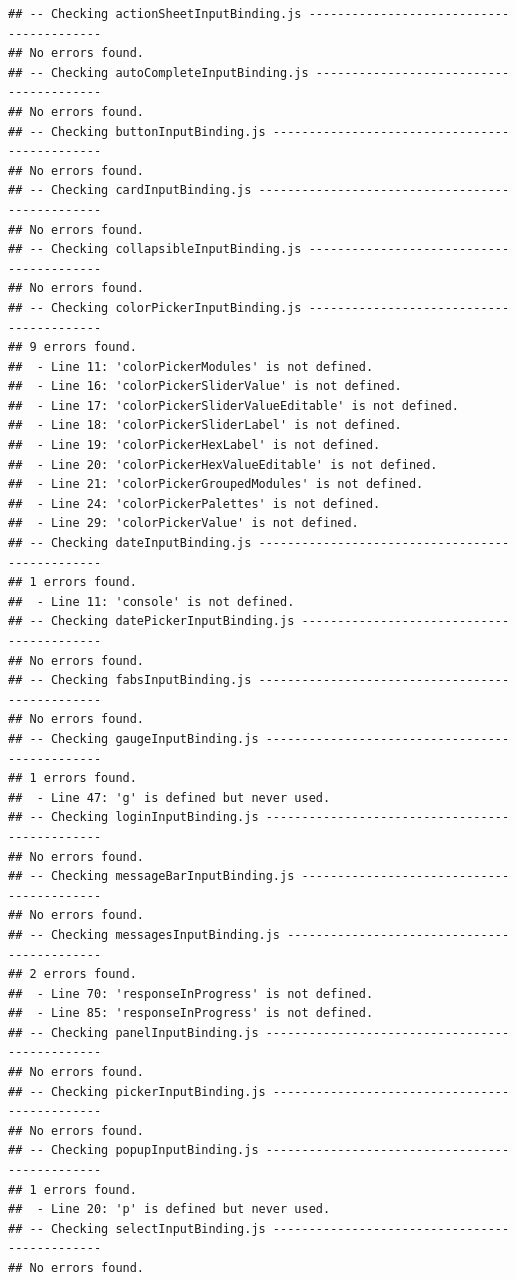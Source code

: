 \documentclass[]{book}
\begin{document}
\begin{verbatim}
## -- Checking actionSheetInputBinding.js ----------------------------------------- 
## No errors found. 
## -- Checking autoCompleteInputBinding.js ---------------------------------------- 
## No errors found. 
## -- Checking buttonInputBinding.js ---------------------------------------------- 
## No errors found. 
## -- Checking cardInputBinding.js ------------------------------------------------ 
## No errors found. 
## -- Checking collapsibleInputBinding.js ----------------------------------------- 
## No errors found. 
## -- Checking colorPickerInputBinding.js ----------------------------------------- 
## 9 errors found. 
##  - Line 11: 'colorPickerModules' is not defined. 
##  - Line 16: 'colorPickerSliderValue' is not defined. 
##  - Line 17: 'colorPickerSliderValueEditable' is not defined. 
##  - Line 18: 'colorPickerSliderLabel' is not defined. 
##  - Line 19: 'colorPickerHexLabel' is not defined. 
##  - Line 20: 'colorPickerHexValueEditable' is not defined. 
##  - Line 21: 'colorPickerGroupedModules' is not defined. 
##  - Line 24: 'colorPickerPalettes' is not defined. 
##  - Line 29: 'colorPickerValue' is not defined. 
## -- Checking dateInputBinding.js ------------------------------------------------ 
## 1 errors found. 
##  - Line 11: 'console' is not defined. 
## -- Checking datePickerInputBinding.js ------------------------------------------ 
## No errors found. 
## -- Checking fabsInputBinding.js ------------------------------------------------ 
## No errors found. 
## -- Checking gaugeInputBinding.js ----------------------------------------------- 
## 1 errors found. 
##  - Line 47: 'g' is defined but never used. 
## -- Checking loginInputBinding.js ----------------------------------------------- 
## No errors found. 
## -- Checking messageBarInputBinding.js ------------------------------------------ 
## No errors found. 
## -- Checking messagesInputBinding.js -------------------------------------------- 
## 2 errors found. 
##  - Line 70: 'responseInProgress' is not defined. 
##  - Line 85: 'responseInProgress' is not defined. 
## -- Checking panelInputBinding.js ----------------------------------------------- 
## No errors found. 
## -- Checking pickerInputBinding.js ---------------------------------------------- 
## No errors found. 
## -- Checking popupInputBinding.js ----------------------------------------------- 
## 1 errors found. 
##  - Line 20: 'p' is defined but never used. 
## -- Checking selectInputBinding.js ---------------------------------------------- 
## No errors found. 

\end{verbatim}
\end{document}
